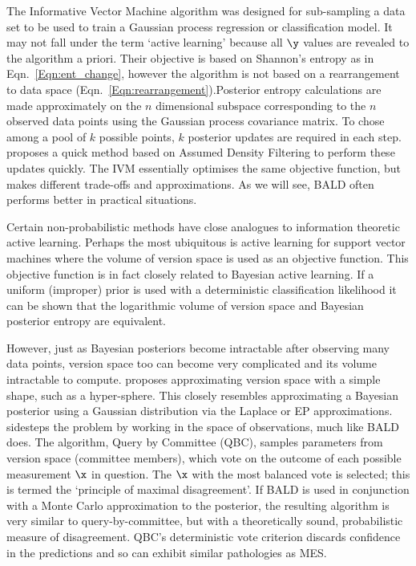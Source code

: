 The Informative Vector Machine \citep[IVM,][]{lawrence2004} algorithm was designed for sub-sampling a data set to be used to train a Gaussian process regression or classification model. It may not fall under the term `active learning' because all $\y$ values are revealed to the algorithm a priori. Their objective is based on Shannon's entropy as in Eqn.\ \eqref{Eqn:ent_change}, however the algorithm is not based on a rearrangement to data space (Eqn.\ \eqref{Eqn:rearrangement}).Posterior entropy calculations are made approximately on the $n$ dimensional subspace corresponding to the $n$ observed data points using the Gaussian process covariance matrix. To chose among a pool of $k$ possible points, $k$ posterior updates are required in each step. \citep{lawrence2004} proposes a quick method based on Assumed Density Filtering to perform these updates quickly. The IVM essentially optimises the same objective function, but makes different trade-offs and approximations. As we will see, BALD often performs better in practical situations.

Certain non-probabilistic methods have close analogues to information theoretic active learning. Perhaps the most ubiquitous is active learning for support vector machines \citep[SVM,][]{tong2001,seung1992} where the volume of version space is used as an objective function. This objective function is in fact closely related to Bayesian active learning. If a uniform (improper) prior is used with a deterministic classification likelihood it can be shown that the logarithmic volume of version space and Bayesian posterior entropy are equivalent.

However, just as Bayesian posteriors become intractable after observing many data points, version space too can become very complicated and its volume intractable to compute. \citep{tong2001} proposes approximating version space with a simple shape, such as a hyper-sphere. This closely resembles approximating a Bayesian posterior using a Gaussian distribution via the Laplace or EP approximations. \citep{seung1992} sidesteps the problem by working in the space of observations, much like BALD does. The algorithm, Query by Committee (QBC), samples parameters from version space (committee members), which vote on the outcome of each possible measurement $\x$ in question. The $\x$ with the most balanced vote is selected; this is termed the `principle of maximal disagreement'. If BALD is used in conjunction with a Monte Carlo approximation to the posterior, the resulting algorithm is very similar to query-by-committee, but with a theoretically sound, probabilistic measure of disagreement. QBC's deterministic vote criterion discards confidence in the predictions and so can exhibit similar pathologies as MES.

